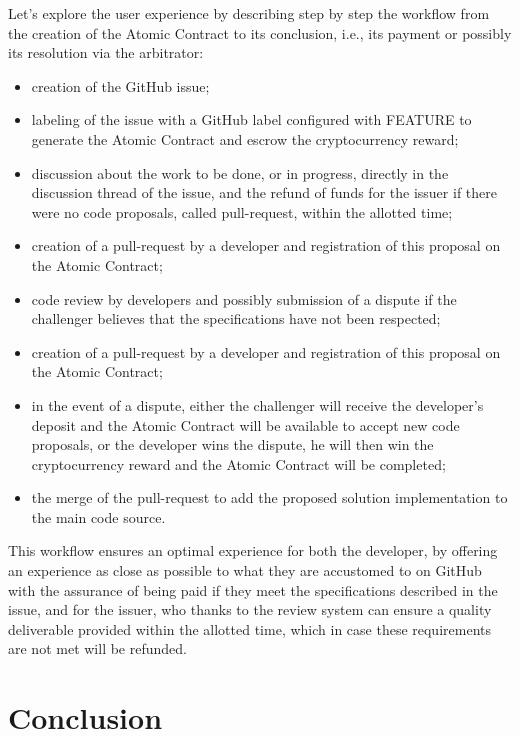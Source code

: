 \documentclass[
	a4paper, %
	10pt, %
	unnumberedsections, %
	twoside, %
]{LTJournalArticle}
\begin{document}
Let's explore the user experience by describing step by step the workflow from the creation of the Atomic Contract to its conclusion, i.e., its payment or possibly its resolution via the arbitrator:

\begin{itemize}
    \item creation of the GitHub issue;
    \item labeling of the issue with a GitHub label configured with FEATURE to generate the Atomic Contract and escrow the cryptocurrency reward;
    \item discussion about the work to be done, or in progress, directly in the discussion thread of the issue, and the refund of funds for the issuer if there were no code proposals, called pull-request, within the allotted time;
    \item creation of a pull-request by a developer and registration of this proposal on the Atomic Contract;
    \item code review by developers and possibly submission of a dispute if the challenger believes that the specifications have not been respected;
    \item creation of a pull-request by a developer and registration of this proposal on the Atomic Contract;
    \item in the event of a dispute, either the challenger will receive the developer's deposit and the Atomic Contract will be available to accept new code proposals, or the developer wins the dispute, he will then win the cryptocurrency reward and the Atomic Contract will be completed;
    \item the merge of the pull-request to add the proposed solution implementation to the main code source.
\end{itemize}

This workflow ensures an optimal experience for both the developer, by offering an experience as close as possible to what they are accustomed to on GitHub with the assurance of being paid if they meet the specifications described in the issue, and for the issuer, who thanks to the review system can ensure a quality deliverable provided within the allotted time, which in case these requirements are not met will be refunded.

\section{Conclusion}
\end{document}
